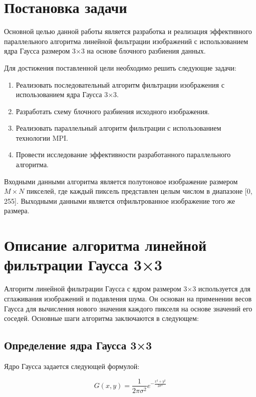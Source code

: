 \documentclass[14pt]{extarticle}
\theoremstyle{definition}
\theoremstyle{remark}
\begin{document}
\newpage

\section{Постановка задачи}
Основной целью данной работы является разработка и реализация эффективного параллельного алгоритма линейной фильтрации изображений с использованием ядра Гаусса размером 3×3 на основе блочного разбиения данных.

Для достижения поставленной цели необходимо решить следующие задачи:

\begin{enumerate}
    \item Реализовать последовательный алгоритм фильтрации изображения с использованием ядра Гаусса 3×3.

    \item Разработать схему блочного разбиения исходного изображения.

    \item Реализовать параллельный алгоритм фильтрации с использованием технологии MPI.

    \item Провести исследование эффективности разработанного параллельного алгоритма.
\end{enumerate}
Входными данными алгоритма является полутоновое изображение размером $M \times N$ пикселей, где каждый пиксель представлен целым числом в диапазоне [0, 255]. Выходными данными является отфильтрованное изображение того же размера.
\clearpage
\section{Описание алгоритма линейной фильтрации Гаусса 3×3}

Алгоритм линейной фильтрации Гаусса с ядром размером 3×3 используется для сглаживания изображений и подавления шума. Он основан на применении весов Гаусса для вычисления нового значения каждого пикселя на основе значений его соседей. Основные шаги алгоритма заключаются в следующем:

\subsection{Определение ядра Гаусса 3×3}

Ядро Гаусса задается следующей формулой:

\begin{equation}
G(x, y) = \frac{1}{2\pi\sigma^2} e^{-\frac{x^2 + y^2}{2\sigma^2}}
\end{equation}
\end{document}
